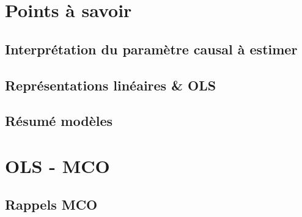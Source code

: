 \documentclass[12pt, french]{article}
\begin{document}

\newpage

\pagestyle{fancy}
\fancyhead[L]{}
\fancyhead[R]{}
\tableofcontents
\break

\pagestyle{fancy}
\fancyhead[L]{\leftmark}
\fancyhead[R]{}

\section{Points à savoir}
\subsection{Interprétation du paramètre causal à estimer}

\subsection{Représentations linéaires \& OLS}

\subsection{Résumé modèles}
%

\newpage

\section{OLS - MCO}
%
\subsection{Rappels MCO}
%
\end{document}
